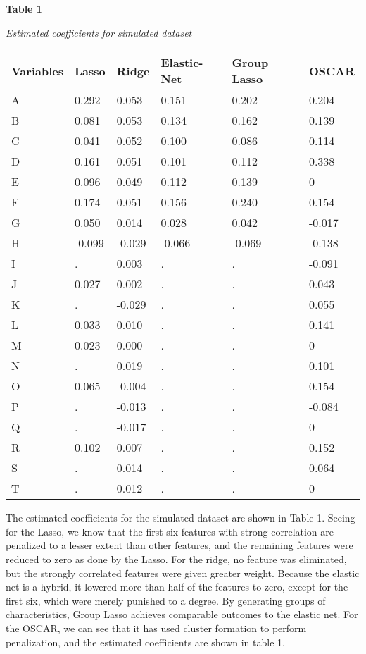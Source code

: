 \documentclass{article} %
\begin{document}
\noindent 

\noindent \textbf{Table 1}

\noindent \textit{Estimated coefficients for simulated dataset}

\begin{tabular}{|p{0.7in}|p{0.7in}|p{0.7in}|p{0.7in}|p{0.7in}|p{0.6in}|} \hline 
Variables & Lasso & Ridge & Elastic-Net & Group Lasso & OSCAR \\ \hline 
A & 0.292 & 0.053 & 0.151 & 0.202 & 0.204 \\ \hline 
B & 0.081 & 0.053 & 0.134 & 0.162 & 0.139 \\ \hline 
C & 0.041 & 0.052 & 0.100 & 0.086 & 0.114 \\ \hline 
D & 0.161 & 0.051 & 0.101 & 0.112 & 0.338 \\ \hline 
E & 0.096 & 0.049 & 0.112 & 0.139 & 0 \\ \hline 
F & 0.174 & 0.051 & 0.156 & 0.240 & 0.154 \\ \hline 
G & 0.050 & 0.014 & 0.028 & 0.042 & -0.017 \\ \hline 
H & -0.099 & -0.029 & -0.066 & -0.069 & -0.138 \\ \hline 
I & . & 0.003 & . & . & -0.091 \\ \hline 
J & 0.027 & 0.002 & . & . & 0.043 \\ \hline 
K & . & -0.029 & . & . & 0.055 \\ \hline 
L & 0.033 & 0.010 & . & . & 0.141 \\ \hline 
M & 0.023 & 0.000 & . & . & 0 \\ \hline 
N & . & 0.019 & . & . & 0.101 \\ \hline 
O & 0.065 & -0.004 & . & . & 0.154 \\ \hline 
P & . & -0.013 & . & . & -0.084 \\ \hline 
Q & . & -0.017 & . & . & 0 \\ \hline 
R & 0.102 & 0.007 & . & . & 0.152 \\ \hline 
S & . & 0.014 & . & . & 0.064 \\ \hline 
T & . & 0.012 & . & . & 0 \\ \hline 
\end{tabular}



\noindent The estimated coefficients for the simulated dataset are shown in Table 1. Seeing for the Lasso, we know that the first six features with strong correlation are penalized to a lesser extent than other features, and the remaining features were reduced to zero as done by the Lasso. For the ridge, no feature was eliminated, but the strongly correlated features were given greater weight. Because the elastic net is a hybrid, it lowered more than half of the features to zero, except for the first six, which were merely punished to a degree. By generating groups of characteristics, Group Lasso achieves comparable outcomes to the elastic net. For the OSCAR, we can see that it has used cluster formation to perform penalization, and the estimated coefficients are shown in table 1.\textbf{}
\end{document}
